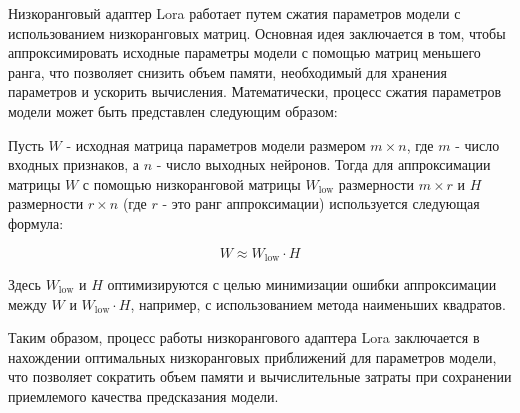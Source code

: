 Низкоранговый адаптер Lora работает путем сжатия параметров модели с использованием низкоранговых матриц. Основная идея заключается в том, чтобы аппроксимировать исходные параметры модели с помощью матриц меньшего ранга, что позволяет снизить объем памяти, необходимый для хранения параметров и ускорить вычисления. Математически, процесс сжатия параметров модели может быть представлен следующим образом:

Пусть \( W \) - исходная матрица параметров модели размером \( m \times n \), где \( m \) - число входных признаков, а \( n \) - число выходных нейронов. Тогда для аппроксимации матрицы \( W \) с помощью низкоранговой матрицы \( W_{\text{low}} \) размерности \( m \times r \) и \( H \) размерности \( r \times n \) (где \( r \) - это ранг аппроксимации) используется следующая формула:

\[ W \approx W_{\text{low}} \cdot H \]

Здесь \( W_{\text{low}} \) и \( H \) оптимизируются с целью минимизации ошибки аппроксимации между \( W \) и \( W_{\text{low}} \cdot H \), например, с использованием метода наименьших квадратов.

Таким образом, процесс работы низкорангового адаптера Lora заключается в нахождении оптимальных низкоранговых приближений для параметров модели, что позволяет сократить объем памяти и вычислительные затраты при сохранении приемлемого качества предсказания модели.
